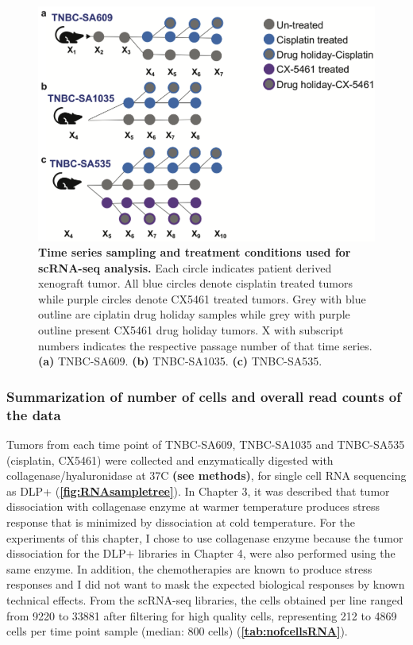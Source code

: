 
\begin{figure}
\centering
\includegraphics[width=\textwidth]{Figures/chap5/SchematicsforRNAsampling.png}
	
\caption[SchematicsforRNAsampling]
	{\small
	\textbf{Time series sampling and treatment conditions used for scRNA-seq analysis.}
	Each circle indicates patient derived xenograft tumor. All blue circles denote cisplatin treated tumors while purple circles denote CX5461 treated tumors. Grey with blue outline are ciplatin drug holiday samples while grey with purple outline present CX5461 drug holiday tumors. X with subscript numbers indicates the respective passage number of that time series. 
	   \textbf{(a)} TNBC-SA609.
	    \textbf{(b)} TNBC-SA1035.
	    \textbf{(c)} TNBC-SA535.
	}
	\label{fig:RNAsampletree}
\end{figure}
 
 
\subsubsection{Summarization of number of cells and overall read counts of the data}
Tumors from each time point of TNBC-SA609, TNBC-SA1035 and TNBC-SA535 (cisplatin, CX5461) were collected and enzymatically digested with collagenase/hyaluronidase at 37\textdegree C \textbf{(see methods)}, for single cell RNA sequencing as DLP+ (\textbf{\autoref{fig:RNAsampletree}}). In Chapter 3, it was described that tumor dissociation with collagenase enzyme at warmer temperature produces stress response that is minimized
by dissociation at cold temperature. For the experiments of this chapter, I chose to use collagenase enzyme because the tumor dissociation for the DLP+ libraries in Chapter 4, were also performed using the same enzyme. In addition, the chemotherapies are known to produce stress responses and I did not want to mask the expected biological responses by known technical effects. 
From the scRNA-seq libraries, the cells obtained per line ranged from 9220 to 33881 after filtering for high quality cells, representing 212 to 4869 cells per time point sample (median: 800 cells) (\textbf{\autoref{tab:nofcellsRNA}}). 

